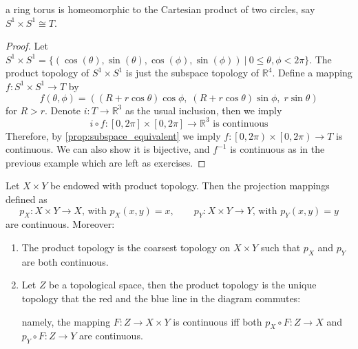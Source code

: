 \begin{example}
\begin{proposition} a ring torus is homeomorphic to the Cartesian product of two circles, say \({S}^{1} \times  {S}^{1} \cong  T\).
\end{proposition}
\begin{proof} 
Let $S^1 \times S^1 = \{(\cos(\theta),\sin(\theta),\cos(\phi),\sin(\phi))\ |\ 0 \leq \theta,\phi <2\pi\}$. The product topology of $S^1 \times S^1$ is just the subspace topology of $\mathbb{R}^4$. Define a mapping \(f : S^1  \times  S^1   \rightarrow  T\) by
\[
f\left({\theta,\phi}\right)  = \left({\left({R + r\cos \theta}\right) \cos \phi,\;\left({R + r\cos \theta}\right) \sin \phi,\;r\sin \theta}\right)
\]
for $R > r$. Denote \(i : T \rightarrow  {\mathbb{R}}^{3}\) as the usual inclusion, then we imply
\[
i \circ  f : \left\lbrack  {0,{2\pi}}\right\rbrack   \times  \left\lbrack  {0,{2\pi}}\right\rbrack   \rightarrow  {\mathbb{R}}^{3}\text{ is continuous}
\]
Therefore, by \autoref{prop:subspace_equivalent} we imply \(f : \left\lbrack  {0,{2\pi}}\right)   \times  \left\lbrack  {0,{2\pi}}\right)   \rightarrow  T\) is continuous. We can also show it is bijective, and \({f}^{-1}\) is continuous as in the previous example which are left as exercises.
\end{proof}

\begin{proposition} Let \(X \times  Y\) be endowed with product topology. Then the projection mappings defined as
\[
p_X : X \times  Y \rightarrow  X\text{, with }p_X\left({x,y}\right)  = x, \quad \quad 
p_Y : X \times  Y \rightarrow  Y\text{, with }p_Y\left({x,y}\right)  = y
\]
are continuous. Moreover:
\begin{enumerate}
    \item The product topology is the coarsest topology on \(X \times  Y\) such that \(p_X\) and \(p_Y\) are both continuous.

    \item Let \(Z\) be a topological space, then the product topology is the unique topology that the red and the blue line in the diagram commutes:
\begin{center}
\end{center}
namely, the mapping \(F : Z \rightarrow  X \times  Y\) is continuous iff both \(p_X \circ  F : Z \rightarrow  X\) and
\(p_Y \circ  F : Z \rightarrow  Y\) are continuous.
\end{enumerate}
\end{proposition}


\end{example}
